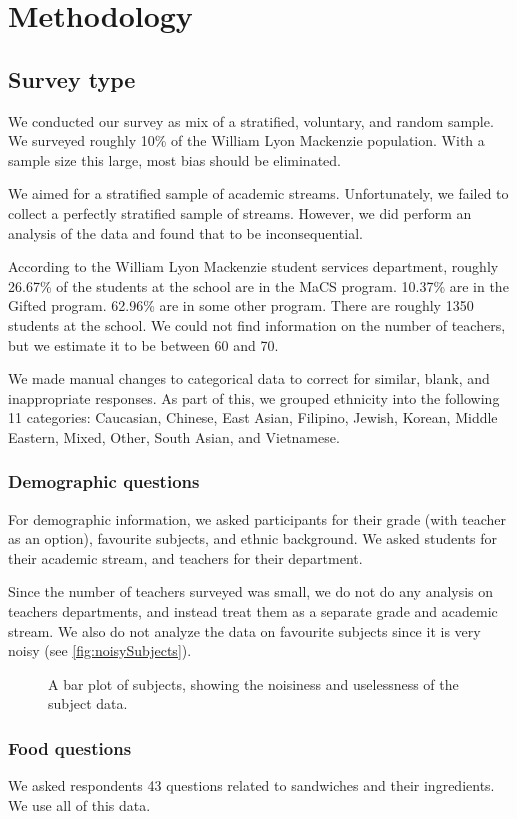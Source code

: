 \chapter{Methodology}

\section{Survey type}
We conducted our survey as mix of a stratified, voluntary, and random sample.
We surveyed roughly 10\% of the William Lyon Mackenzie population.
With a sample size this large, most bias should be eliminated.

We aimed for a stratified sample of academic streams.
Unfortunately, we failed to collect a perfectly stratified sample of streams.
However, we did perform an analysis of the data and found that to be inconsequential.

According to the William Lyon Mackenzie student services department, roughly 26.67\% of the students at the school are in the MaCS program.
10.37\% are in the Gifted program.
62.96\% are in some other program.
There are roughly 1350 students at the school.
We could not find information on the number of teachers, but we estimate it to be between 60 and 70.

We made manual changes to categorical data to correct for similar, blank, and inappropriate responses.
As part of this, we grouped ethnicity into the following 11 categories: Caucasian, Chinese, East Asian, Filipino, Jewish, Korean, Middle Eastern, Mixed, Other, South Asian, and Vietnamese.

\subsection*{Demographic questions}
For demographic information, we asked participants for their grade (with teacher as an option), favourite subjects, and ethnic background.
We asked students for their academic stream, and teachers for their department.

Since the number of teachers surveyed was small, we do not do any analysis on teachers departments, and instead treat them as a separate grade and academic stream.
We also do not analyze the data on favourite subjects since it is very noisy (see \vref{fig:noisySubjects}).

\begin{figure}[H]
	\caption{A bar plot of subjects, showing the noisiness and uselessness of the subject data.}
	\label{fig:noisySubjects}
\end{figure}

\subsection*{Food questions}
We asked respondents 43 questions related to sandwiches and their ingredients.
We use all of this data.
